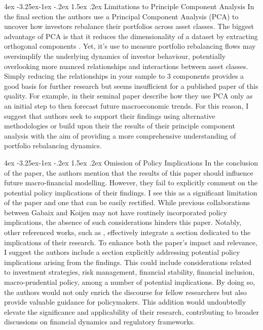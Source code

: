 \documentclass[]{article}
\makeatletter
\renewcommand\subsection{\leftskip 4ex\@startsection{subsection}{2}{\z@}%
	{-3.25ex\@plus -1ex \@minus -.2ex}%
	{1.5ex \@plus .2ex}%
	{\normalfont\large\bfseries}}
\makeatother
\begin{document}
\begin{spacing}{1.1}
	\subsection{Limitations to Principle Component Analysis}
	In the final section the authors use a Principal Component Analysis (PCA) to uncover how investors rebalance their portfolios across asset classes. The biggest advantage of PCA is that it reduces the dimensionality of a dataset by extracting orthogonal components \parencite{tsoulfidis2022new}. Yet, it's use to measure portfolio rebalancing flows may oversimplify the underlying dynamics of investor behaviour, potentially overlooking more nuanced relationships and interactions between asset classes. Simply reducing the relationships in your sample to 3 components provides a good basis for further research but seems insufficient for a published paper of this quality. For example, in their seminal paper \cite{stock2002forecasting} describe how they use PCA only as an initial step to then forecast future macroeconomic trends. For this reason, I suggest that authors seek to support their findings using alternative methodologies or build upon their the results of their principle component analysis with the aim of providing a more comprehensive understanding of portfolio rebalancing dynamics.
	
	
	\subsection{Omission of Policy Implications}
	In the conclusion of the paper, the authors mention that the results of this paper should influence future macro-financial modelling. However, they fail to explicitly comment on the potential policy implications of their findings. I see this as a significant limitation of the paper and one that can be easily rectified. While previous collaborations between Gabaix and Koijen may not have routinely incorporated policy implications, the absence of such considerations hinders this paper. Notably, other referenced works, such as \cite{haddad2021competitive}, effectively integrate a section dedicated to the implications of their research. To enhance both the paper's impact and relevance, I suggest the authors include a section explicitly addressing potential policy implications arising from the findings.  This could include considerations related to investment strategies, risk management, financial stability, financial inclusion, macro-prudential policy, among a number of potential implications. By doing so, the authors would not only enrich the discourse for fellow researchers but also provide valuable guidance for policymakers. This addition would undoubtedly elevate the significance and applicability of their research, contributing to broader discussions on financial dynamics and regulatory frameworks. 
	

\end{spacing}
\end{document}

